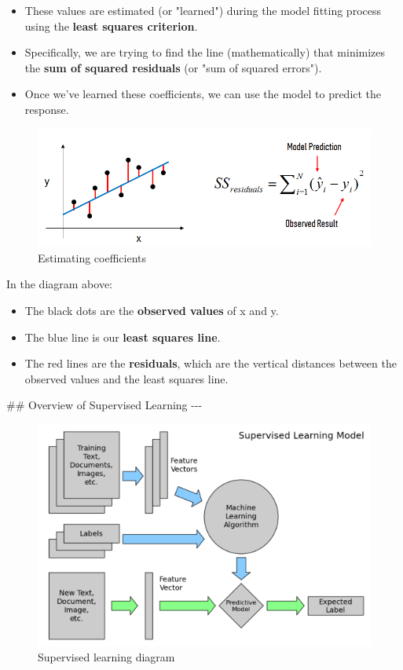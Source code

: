 \documentclass[11pt]{article}
\makeatletter
\def\maxwidth{\ifdim\Gin@nat@width>\linewidth\linewidth
    \else\Gin@nat@width\fi}
\let\Oldincludegraphics\includegraphics
\renewcommand{\includegraphics}[1]{\Oldincludegraphics[width=.8\maxwidth]{#1}}
\providecommand{\tightlist}{%
      \setlength{\itemsep}{0pt}\setlength{\parskip}{0pt}}
\makeatother
\begin{document}
\begin{itemize}
\tightlist
\item
  These values are estimated (or "learned") during the model fitting
  process using the \textbf{least squares criterion}.
\item
  Specifically, we are trying to find the line (mathematically) that
  minimizes the \textbf{sum of squared residuals} (or "sum of squared
  errors").
\item
  Once we've learned these coefficients, we can use the model to predict
  the response.
\end{itemize}

\begin{figure}
\centering
\includegraphics{./assets/estimating_coefficients.png}
\caption{Estimating coefficients}
\end{figure}

In the diagram above:

\begin{itemize}
\tightlist
\item
  The black dots are the \textbf{observed values} of x and y.
\item
  The blue line is our \textbf{least squares line}.
\item
  The red lines are the \textbf{residuals}, which are the vertical
  distances between the observed values and the least squares line.
\end{itemize}

     \#\# Overview of Supervised Learning -\/-\/-

\begin{figure}
\centering
\includegraphics{./assets/supervised_learning.png}
\caption{Supervised learning diagram}
\end{figure}
\end{document}
